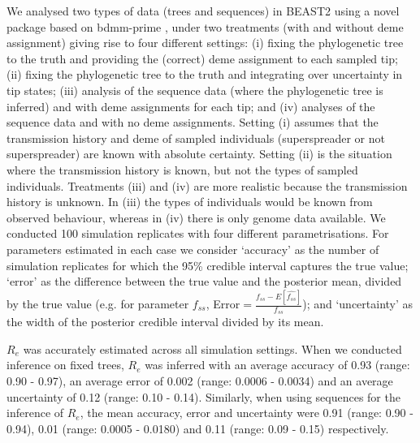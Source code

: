 \documentclass[lineno,pdflatex,sn-nature]{sn-jnl}%
\theoremstyle{thmstyleone}%
\theoremstyle{thmstyletwo}%
\theoremstyle{thmstylethree}%
\begin{document}
We analysed two types of data (trees and sequences) in BEAST2 using a novel package based on bdmm-prime \cite{vanWees2022quantifying}, under two treatments (with and without deme assignment) giving rise to four different settings: (i) fixing the phylogenetic tree to the truth and providing the (correct) deme assignment to each sampled tip; (ii) fixing the phylogenetic tree to the truth and integrating over uncertainty in tip states; (iii) analysis of the sequence data (where the phylogenetic tree is inferred) and with deme assignments for each tip; and (iv) analyses of the sequence data and with no deme assignments. Setting (i) assumes that the transmission history and deme of sampled individuals (superspreader or not superspreader) are known with absolute certainty. Setting (ii) is the situation where the transmission history is known, but not the types of sampled individuals. Treatments (iii) and (iv) are more realistic because the transmission history is unknown. In (iii) the types of individuals would be known from observed behaviour, whereas in (iv) there is only genome data available. We conducted 100 simulation replicates with four different parametrisations. For parameters estimated in each case we consider `accuracy' as the number of simulation replicates for which the 95\% credible interval captures the true value; `error' as the difference between the true value and the posterior mean, divided by the true value (e.g. for parameter $f_{ss}$, Error$=\frac{f_{ss} - E[\hat{f_{ss}}]}{f_{ss}}$); and `uncertainty' as the width of the posterior credible interval divided by its mean.
\newline

$R_{e}$ was accurately estimated across all simulation settings. When we conducted inference on fixed trees, $R_{e}$ was inferred with an average accuracy of 0.93 (range: 0.90 - 0.97), an average error of 0.002 (range: 0.0006 - 0.0034) and an average uncertainty of 0.12 (range: 0.10 - 0.14). Similarly, when using sequences for the inference of $R_{e}$, the mean accuracy, error and uncertainty were 0.91 (range: 0.90 - 0.94), 0.01 (range: 0.0005 - 0.0180) and 0.11 (range: 0.09 - 0.15) respectively. \newline
\end{document}
